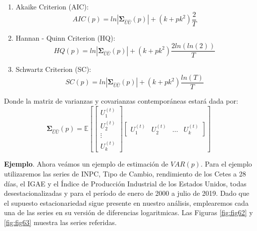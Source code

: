 \documentclass[
]{book}
\begin{document}
\begin{enumerate}
\def\labelenumi{\arabic{enumi}.}
\setcounter{enumi}{1}
\item
  Akaike Criterion (AIC):
  \begin{equation}
       AIC(p) = ln|\mathbf{\Sigma}_{\hat{U}\hat{U}}(p)| + (k + p k^2) \frac{2}{T}
       \end{equation}
\item
  Hannan - Quinn Criterion (HQ):
  \begin{equation}
       HQ(p) = ln|\mathbf{\Sigma}_{\hat{U}\hat{U}}(p)| + (k + p k^2) \frac{2ln(ln(2))}{T}
       \end{equation}
\item
  Schwartz Criterion (SC):
  \begin{equation}
       SC(p) = ln|\mathbf{\Sigma}_{\hat{U}\hat{U}}(p)| + (k + p k^2) \frac{ln(T)}{T}
       \end{equation}
\end{enumerate}

Donde la matriz de varianzas y covarianzas contemporáneas estará dada por:
\begin{equation*}
            \mathbf{\Sigma}_{\hat{U}\hat{U}}(p) = \mathbb{E} \left[
            \begin{bmatrix}
            U^{(t)}_{1} \\ U^{(t)}_{2} \\ \vdots \\ U^{(t)}_{k}
            \end{bmatrix}
            \begin{bmatrix}
            U^{(t)}_{1} & U^{(t)}_{2} & \ldots & U^{(t)}_{k}
            \end{bmatrix}
            \right]
    \end{equation*}

\textbf{Ejemplo}. Ahora veámos un ejemplo de estimación de \(VAR(p)\). Para el ejemplo utilizaremos las series de INPC, Tipo de Cambio, rendimiento de los Cetes a 28 días, el IGAE y el Índice de Producción Industrial de los Estados Unidos, todas desestacionalizadas y para el período de enero de 2000 a julio de 2019. Dado que el supuesto estacionariedad sigue presente en nuestro análisis, emplearemos cada una de las series en su versión de diferencias logaritmicas. Las Figuras \ref{fig:fig62} y \ref{fig:fig63} muestra las series referidas.
\end{document}
